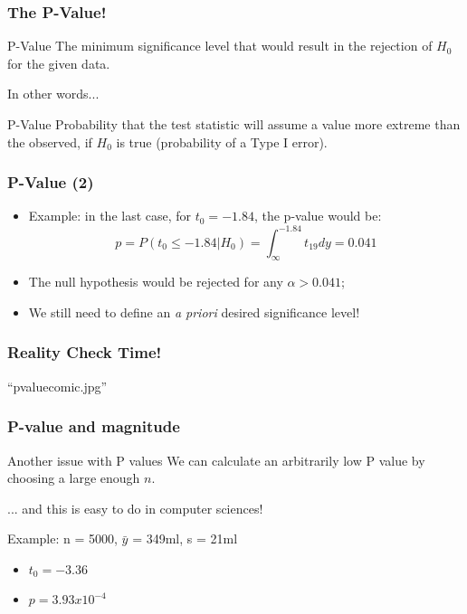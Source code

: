 \documentclass[10pt]{beamer}
\begin{document}
\begin{frame}
  \frametitle{The P-Value!}

  \begin{block}{P-Value}
    The minimum significance level that would result in the rejection
    of $H_0$ for the given data.
  \end{block}
  \bigskip
  
  In other words...
  \bigskip

  \begin{block}{P-Value}
    Probability that the test statistic will assume a value more
    extreme than the observed, if $H_0$ is true (probability of a
    Type I error).
  \end{block}
\end{frame}

\begin{frame}
  \frametitle{P-Value (2)}
  \begin{itemize}
  \item Example: in the last case, for $t_0 = -1.84$, the p-value would be:
    \begin{equation*}
      p = P(t_0 \leq -1.84|H_0) = \int^{-1.84}_{\infty} t_{19}dy = 0.041
    \end{equation*}
  \item The null hypothesis would be rejected for any $\alpha > 0.041$;
    \medskip

  \item We still need to define an {\it a priori} desired significance level!    
  \end{itemize}
\end{frame}

\begin{frame}
  \frametitle{Reality Check Time!}
  ``pvaluecomic.jpg''
\end{frame}

\begin{frame}
  \frametitle{P-value and magnitude}
  
  \begin{block}{Another issue with P values}
    We can calculate an arbitrarily low P value by choosing a large enough $n$.
    \medskip
    
    ... and this is easy to do in computer sciences!
  \end{block}
  
  \begin{block}{Example: n = 5000, $\bar{y}$ = 349ml, s = 21ml}
    \begin{itemize}
      \item $t_0 = -3.36$
      \item $p = 3.93 x 10^{-4}$
    \end{itemize}
  \end{block}
\end{frame}
\end{document}
